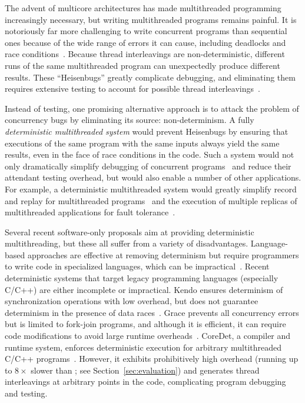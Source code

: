 
\label{sec:introduction}

The advent of multicore architectures has made multithreaded
programming increasingly necessary, but writing multithreaded programs
remains painful. It is notoriously far more challenging to write
concurrent programs than sequential ones because of the wide range of
errors it can cause, including deadlocks and race
conditions~\cite{havender,76897,130623}. Because thread interleavings
are non-deterministic, different runs of the same multithreaded
program can unexpectedly produce different results. These
``Heisenbugs'' greatly complicate debugging, and eliminating them
requires extensive testing to account for possible thread
interleavings~\cite{DBLP:conf/icse/BallBHMQ09,DBLP:conf/asplos/BurckhardtKMN10}.


Instead of testing, one promising alternative approach is to attack
the problem of concurrency bugs by eliminating its source:
non-determinism. A fully \emph{deterministic multithreaded system}
would prevent Heisenbugs by ensuring that executions of the same
program with the same inputs always yield the same results, even in
the face of race conditions in the code. Such a system would not only
dramatically simplify debugging of concurrent
programs~\cite{Carver:1991:RTC:624586.625040} and reduce their
attendant testing overhead, but would also enable a number of other
applications. For example, a deterministic multithreaded system would
greatly simplify record and replay for multithreaded
programs~\cite{Choi:1998:DRJ:281035.281041,LeBlanc:1987:DPP:32387.32396}
and the execution of multiple replicas of multithreaded applications
for fault
tolerance~\cite{deterministic-process-groups,1134000,224058,replicant-hotos}.

Several recent software-only proposals aim at providing
deterministic multithreading, but these all suffer from a variety of
disadvantages. Language-based approaches are effective at removing
determinism but require programmers to write code in specialized
languages, which can be
impractical~\cite{Bocchino:2009:TES:1640089.1640097,Burckhardt:2010:CPR:1869459.1869515,Simpson:1999:SEE:330346.330357}. Recent
deterministic systems that target legacy programming languages
(especially C/C++) are either incomplete or impractical. Kendo ensures
determinism of synchronization operations with low overhead, but does
not guarantee determinism in the presence of data
races~\cite{1508256}. Grace prevents all concurrency errors but is
limited to fork-join programs, and although it is efficient, it can require
code modifications to avoid large runtime
overheads~\cite{grace}. CoreDet, a compiler and runtime system,
enforces deterministic execution for arbitrary multithreaded C/C++
programs~\cite{Bergan:2010:CCR:1736020.1736029}. However, it exhibits
prohibitively high overhead (running up to $8\times$ slower
than \pthreads{}; see Section~\ref{sec:evaluation}) and generates
thread interleavings at arbitrary points
in the code, complicating program debugging and testing.

